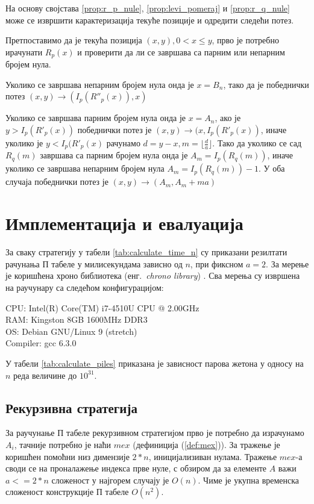 \documentclass[a4paper]{article}
\begin{document}
На основу својстава \ref{prop:r_p_nule}, \ref{prop:levi_pomeraj} и \ref{prop:r_q_nule} може се извршити карактеризација текуће позиције и одредити следећи потез.

Претпоставимо да је текућа позиција $ (x, y), 0 < x \le y $, прво је потребно ирачунати $ R_{p}(x) $ и проверити да ли се завршава са парним или непарним бројем нула.

Уколико се завршава непарним бројем нула онда је $ x = B_{n} $, тако да је победнички потез $ (x, y) \rightarrow (I_{p}(R''_{p}(x)), x) $

Уколико се завршава парним бројем нула онда је $ x = A_{n} $, ако је $ y > I_{p}(R'_{p}(x)) $ победнички потез је $ (x, y) \rightarrow (x, I_{p}(R'_{p}(x)) $, иначе уколико је $ y < I_{p}(R'_{p}(x) $ рачунамо $ d = y - x, m = \lfloor \frac{d}{a} \rfloor $. Тако да уколико се сад $ R_{q}(m) $ завршава са парним бројем нула онда је $ A_{m} = I_{p}(R_{q}(m)) $, иначе уколико се завршава непарним бројем нула $ A_{m} = I_{p}(R_{q}(m)) - 1 $. У оба случаја победнички потез је $ (x, y) \rightarrow (A_{m}, A_{m} + ma) $

\section{Имплементација и евалуација}
\label{implementacija_evaluacija}

За сваку стратегију у табели \ref{tab:calculate_time_n} су приказани резилтати рачунања П табеле у милисекундама зависно од $ n $, при фиксном $ a = 2 $. 
За мерење је коришћена хроно библиотека (енг.{~\em chrono library}) \cite{chrono_library}. Сва мерења су извршена на раучунару са следећом конфигурацијом:
\begin{flushleft}
	CPU: Intel(R) Core(TM) i7-4510U CPU @ 2.00GHz\\
	RAM: Kingston 8GB 1600MHz DDR3\\
	OS: Debian GNU/Linux 9 (stretch)\\
	Compiler: gcc 6.3.0\\
\end{flushleft}

У табели \ref{tab:calculate_piles} приказана је зависност парова жетона у односу на $ n $ реда величине до $ 10^{31} $.

\subsection{Рекурзивна стратегија}

За раучунање П табеле рекурзивном стратегијом прво је потребно да израчунамо $ A_{i} $, тачније потребно је наћи $ mex $ (дефиниција (\ref{def:mex})). За тражење је коришћен помоћни низ димензије $ 2*n $, иницијализиван нулама. Тражење $ mex $-а  своди се на проналажење индекса прве нуле, с обзиром да за елементе $ A $ важи $ a <= 2*n $ сложеност у најгорем случају је $ O(n) $. Чиме је укупна временска сложеност конструкције П табеле $ O(n^2) $.\\
\end{document}
